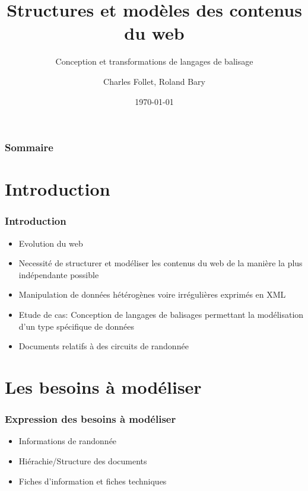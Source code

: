 \documentclass[10pt, compress]{beamer}
\title{Structures et modèles des contenus du web}
\subtitle{Conception et transformations de langages de balisage}
\date{\today}
\author{Charles Follet, Roland Bary}
\institute{Université de Pau et des Pays de l'Adour}
\begin{document}
\maketitle
\begin{frame}[fragile]
  \frametitle{Sommaire}
  \tableofcontents
\end{frame}

\section{Introduction}
\begin{frame}[fragile]
  \frametitle{Introduction}
  \begin{itemize}[<+->]
  [square]
    \item{Evolution du web}
    \item{Necessité de structurer et modéliser les contenus du web de la manière la plus indépendante possible}
    \item{Manipulation de données hétérogènes voire irrégulières exprimés en XML}
    \item{Etude de cas: Conception de langages de balisages permettant la modélisation d'un type spécifique de données}
    \item{Documents relatifs à des circuits de randonnée}
  \end{itemize}
\end{frame}

\section{Les besoins à modéliser}
\begin{frame}[fragile]
  \frametitle{Expression des besoins à modéliser}
      \begin{itemize}
      [square]
	[square]
	\item{Informations de randonnée}
	\item{Hiérachie/Structure des documents}
	\item{Fiches d'information et fiches techniques}
      \end{itemize}    
\end{frame}
\end{document}
